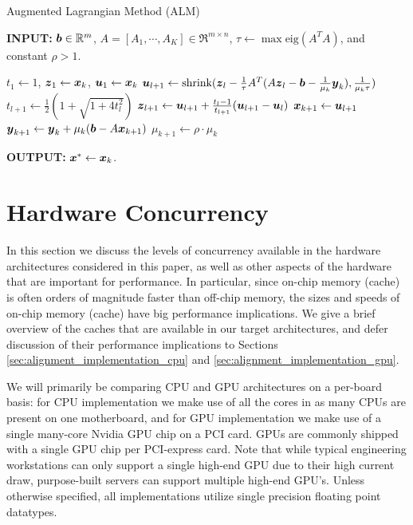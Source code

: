\documentclass[10pt,twocolumn,letterpaper]{article}
\begin{document}
 \begin{algorithm}[h]
\caption{Augmented Lagrangian Method (ALM)}
{\bf INPUT:} ${\boldsymbol{b}} \in {\mathbb{R}}^m$, $A=[A_1,\cdots, A_K] \in \Re^{m \times n}$, $\tau\leftarrow \max\mbox{eig}(A^TA)$, and constant $\rho>1$.
\begin{algorithmic}[1]
\STATE $t_1 \leftarrow 1$, ${\boldsymbol{z}}_1 \leftarrow {\boldsymbol{x}}_k$, ${\boldsymbol{u}}_1 \leftarrow {\boldsymbol{x}}_k$ 
\STATE ${\boldsymbol{u}}_{l+1}  \leftarrow \mbox{shrink}({\boldsymbol{z}}_l - \frac{1}{\tau}A^T(A{\boldsymbol{z}}_l - {\boldsymbol{b}} - \frac{1}{\mu_k}{\boldsymbol{y}}_k), \frac{1}{\mu_k\tau})$
\STATE $t_{l+1} \leftarrow \frac{1}{2}( 1 + \sqrt{1+4t_l^2})$
\STATE ${\boldsymbol{z}}_{l+1} \leftarrow {\boldsymbol{u}}_{l+1}+ \frac{t_l - 1}{t_{l+1}}({\boldsymbol{u}}_{l+1} - {\boldsymbol{u}}_l)$ 
\ENDWHILE 
\STATE ${\boldsymbol{x}}_{k+1} \leftarrow {\boldsymbol{u}}_{l+1}$ 
\STATE ${\boldsymbol{y}}_{k+1} \leftarrow {\boldsymbol{y}}_k + \mu_k ({\boldsymbol{b}} - A{\boldsymbol{x}}_{k+1})$ 
\STATE $\mu_{k+1} \leftarrow \rho\cdot\mu_k$ 
\ENDWHILE 
\end{algorithmic}

{\bf OUTPUT:} ${\boldsymbol{x}}^* \leftarrow {\boldsymbol{x}}_k$.
\label{alg:alm}
\end{algorithm}

\section{Hardware Concurrency} \label{sec:concurrency}

In this section we discuss the levels of concurrency available in the hardware
architectures considered in this paper, as well as other aspects of the
hardware that are important for performance.  In particular, since on-chip
memory (cache) is often orders of magnitude faster than off-chip memory, the
sizes and speeds of on-chip memory (cache) have big performance implications.
We give a brief overview of the caches that are available in our target
architectures, and defer discussion of their performance implications to
Sections \ref{sec:alignment_implementation_cpu} and
\ref{sec:alignment_implementation_gpu}.

We will primarily be comparing CPU and GPU architectures on a per-board basis:
for CPU implementation we make use of all the cores in as many CPUs are present
on one motherboard, and for GPU implementation we make use of a single
many-core Nvidia GPU chip on a PCI card. GPUs are commonly shipped with a
single GPU chip per PCI-express card.  Note that while typical engineering
workstations can only support a single high-end GPU due to their high current
draw, purpose-built servers can support multiple high-end GPU's.  Unless
otherwise specified, all implementations utilize single precision floating
point datatypes.  
\end{document}
